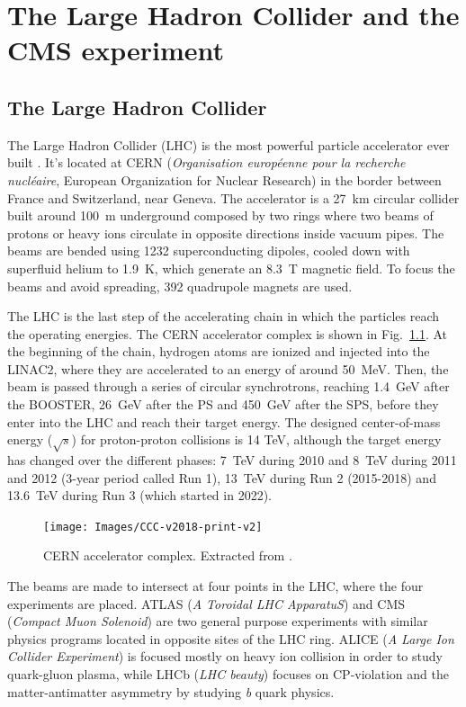 \documentclass[../main.tex]{subfiles}
\begin{document}
\chapter{The Large Hadron Collider and the CMS experiment}

\section{The Large Hadron Collider}
\label{intro:sec:lhc}

The Large Hadron Collider (LHC) is the most powerful particle accelerator ever built \cite{intro:exp:lhc}. It's located at CERN (\textit{Organisation européenne pour la recherche nucléaire}, European Organization for Nuclear Research) in the border between France and Switzerland, near Geneva. The accelerator is a 27~km circular collider built around 100~m underground composed by two rings where two beams of protons or heavy ions circulate in opposite directions inside vacuum pipes. The beams are bended using 1232 superconducting dipoles, cooled down with superfluid helium to 1.9~K, which generate an 8.3~T magnetic field. To focus the beams and avoid spreading, 392 quadrupole magnets are used.

The LHC is the last step of the accelerating chain in which the particles reach the operating energies. The CERN accelerator complex is shown in Fig.~\ref{intro:exp:cern_acc_chain}. At the beginning of the chain, hydrogen atoms are ionized and injected into the LINAC2, where they are accelerated to an energy of around 50~MeV. Then, the beam is passed through a series of circular synchrotrons, reaching 1.4~GeV after the BOOSTER, 26~GeV after the PS and 450~GeV after the SPS, before they enter into the LHC and reach their target energy. The designed center-of-mass energy ($\sqrt{s}$) for proton-proton collisions is 14 TeV, although the target energy has changed over the different phases: 7~TeV during 2010 and 8~TeV during 2011 and 2012 (3-year period called Run 1), 13~TeV during Run 2 (2015-2018) and 13.6~TeV during Run 3 (which started in 2022).

\begin{figure}[h!]
\begin{center}
\texttt{[image: Images/CCC-v2018-print-v2]}
\end{center}
\caption{CERN accelerator complex. Extracted from \cite{intro:exp:cern_acc_chain_image}.}
\label{intro:exp:cern_acc_chain}
\end{figure}

The beams are made to intersect at four points in the LHC, where the four experiments are placed. ATLAS (\textit{A Toroidal LHC ApparatuS}) and CMS (\textit{Compact Muon Solenoid}) are two general purpose experiments with similar physics programs located in opposite sites of the LHC ring. ALICE (\textit{A Large Ion Collider Experiment}) is focused mostly on heavy ion collision in order to study quark-gluon plasma, while LHCb (\textit{LHC beauty}) focuses on CP-violation and the matter-antimatter asymmetry by studying \textit{b} quark physics.
\end{document}
